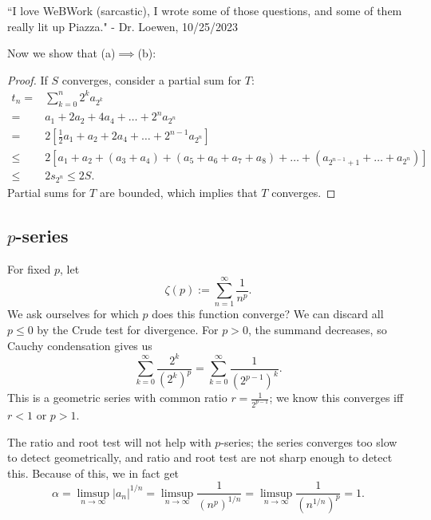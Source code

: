 \begin{nquote}{}
	``I love WeBWork (sarcastic), I wrote some of those questions, and some of them really lit up Piazza." - Dr. Loewen, 10/25/2023
\end{nquote}

Now we show that (a)\(\implies\)(b):
\begin{proof}
	If \(S\) converges, consider a partial sum for \(T\):
	\begin{align*}
		t_n=&\sum_{k=0}^{n}2^ka_{2^k}\\
		=&a_1+2a_2+4a_4+\dots+2^na_{2^n}\\
		=&2\left[\frac{1}{2}a_1+a_2+2a_4+\dots+2^{n-1}a_{2^n}\right]\\
		\leq&2\left[a_1+a_2+(a_3+a_4)+(a_5+a_6+a_7+a_8)+\dots+(a_{2^{n-1}+1}+\dots+a_{2^n})\right]\\
		\leq&2s_{2^n}\leq 2S.
	\end{align*}
	Partial sums for \(T\) are bounded, which implies that \(T\) converges.
\end{proof}

\subsection{\(p\)-series}
For fixed \(p\), let 
\begin{equation*}
	\zeta(p):=\sum_{n=1}^{\infty}\frac{1}{n^p}.
\end{equation*}
We ask ourselves for which \(p\) does this function converge? We can discard all \(p\leq 0\) by the Crude test for divergence. For \(p>0\), the summand decreases, so Cauchy condensation gives us 
\begin{equation*}
	\sum_{k=0}^{\infty}\frac{2^k}{(2^k)^p}=\sum_{k=0}^{\infty}\frac{1}{(2^{p-1})^k}.
\end{equation*}
This is a geometric series with common ratio \(r=\displaystyle\frac{1}{2^{p-1}}\); we know this converges iff \(r<1\) or \(p>1\).
\begin{note}
	The ratio and root test will not help with \(p\)-series; the series converges too slow to detect geometrically, and ratio and root test are not sharp enough to detect this. Because of this, we in fact get 
	\begin{equation*}
		\alpha=\limsup_{n\to\infty}|a_n|^{1/n}=\limsup_{n\to\infty}\frac{1}{(n^p)^{1/n}}=\limsup_{n\to\infty}\frac{1}{(n^{1/n})^p}=1.
	\end{equation*}
\end{note}

